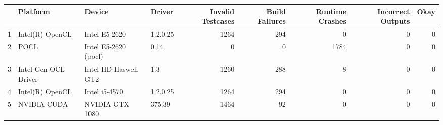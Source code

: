 \begin{tabular}{llllrrrrr}
\toprule
{} &              Platform &                Device &    Driver &  Invalid Testcases &  Build Failures &  Runtime Crashes &  Incorrect Outputs &  Okay \\
\midrule
1 &       Intel(R) OpenCL &         Intel E5-2620 &  1.2.0.25 &               1264 &             294 &                0 &                  0 &     0 \\
2 &                  POCL &  Intel E5-2620 (pocl) &      0.14 &                  0 &               0 &             1784 &                  0 &     0 \\
3 &  Intel Gen OCL Driver &  Intel HD Haswell GT2 &       1.3 &               1260 &             288 &                8 &                  0 &     0 \\
4 &       Intel(R) OpenCL &         Intel i5-4570 &  1.2.0.25 &               1264 &             294 &                0 &                  0 &     0 \\
5 &           NVIDIA CUDA &       NVIDIA GTX 1080 &    375.39 &               1464 &              92 &                0 &                  0 &     0 \\
\bottomrule
\end{tabular}
